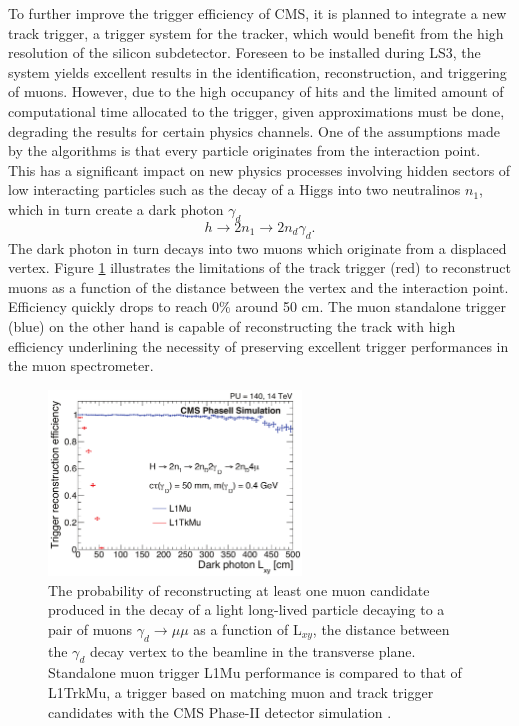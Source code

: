     To further improve the trigger efficiency of CMS, it is planned to integrate a new track trigger, a trigger system for the tracker, which would benefit from the high resolution of the silicon subdetector. Foreseen to be installed during LS3, the system yields excellent results in the identification, reconstruction, and triggering of muons. However, due to the high occupancy of hits and the limited amount of computational time allocated to the trigger, given approximations must be done, degrading the results for certain physics channels. One of the assumptions made by the algorithms is that every particle originates from the interaction point. This has a significant impact on new physics processes involving hidden sectors of low interacting particles such as the decay of a Higgs into two neutralinos $ n_1 $, which in turn create a dark photon $ \gamma_d $
    \begin{equation}
      h \rightarrow 2 n_1 \rightarrow 2 n_d \gamma_d .
    \end{equation}
    The dark photon in turn decays into two muons which originate from a displaced vertex. Figure \ref{fig:II-1-dark-photon} illustrates the limitations of the track trigger (red) to reconstruct muons as a function of the distance between the vertex and the interaction point. Efficiency quickly drops to reach 0\% around 50 cm. The muon standalone trigger (blue) on the other hand is capable of reconstructing the track with high efficiency underlining the necessity of preserving excellent trigger performances in the muon spectrometer.

    \begin{figure}[t!]
      \centering
      \includegraphics[width=0.6\textwidth]{img/II-1-gem/dark-photon.pdf}
      \caption{The probability of reconstructing at least one muon candidate produced in the decay of a light long-lived particle decaying to a pair of muons $\gamma_d \rightarrow \mu \mu $ as a function of L$_{xy}$, the distance between the $\gamma_d$ decay vertex to the beamline in the transverse plane. Standalone muon trigger L1Mu performance is compared to that of L1TrkMu, a trigger based on matching muon and track trigger candidates with the CMS Phase-II detector simulation \cite{Colaleo:2021453}.}
      \label{fig:II-1-dark-photon}
    \end{figure}

